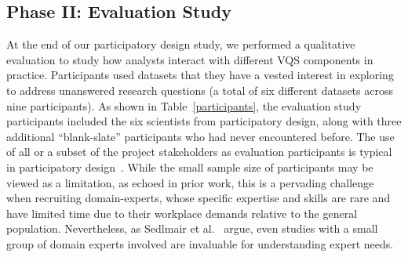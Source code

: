   \subsection{Phase II: Evaluation Study}
  At the end of our participatory design study, we performed a qualitative evaluation to study how analysts interact with different VQS components in practice. Participants used datasets that they have a vested interest in exploring to address unanswered research questions (a total of six different datasets across nine participants). As shown in Table~\ref{participants}, the evaluation study participants included the six scientists from participatory design, along with three additional ``blank-slate'' participants who had never encountered \zvpp before. The use of all or a subset of the project stakeholders as evaluation participants is typical in participatory design~\cite{Bossen2016}. While the small sample size of participants may be viewed as a limitation, as echoed in prior work\cite{Batch2018,Mclachlan2008}, this is a pervading challenge when recruiting domain-experts, whose specific expertise and skills are rare and have limited time due to their workplace demands relative to the general population. Nevertheless, as Sedlmair et al.~\cite{Sedlmair2012} argue, even studies with a small group of domain experts involved are invaluable for understanding expert needs. %
